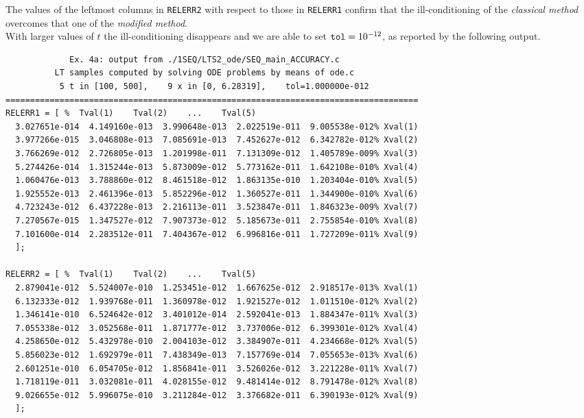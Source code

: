 \documentclass[a4paper,10pt]{report}%
\begin{document}
The values of the leftmost columns in {\tt RELERR2} with respect to those in {\tt RELERR1} confirm that the
ill-conditioning of the {\em classical method} overcomes that one of the {\em modified method}.
\\
With larger values of $t$ the ill-conditioning disappears and we are able to set ${\tt tol}=10^{-12}$,
as reported by the following output.
\begin{lstlisting}
             Ex. 4a: output from ./1SEQ/LTS2_ode/SEQ_main_ACCURACY.c
          LT samples computed by solving ODE problems by means of ode.c
           5 t in [100, 500],    9 x in [0, 6.28319],    tol=1.000000e-012
====================================================================================
RELERR1 = [ %  Tval(1)    Tval(2)    ...    Tval(5)
  3.027651e-014  4.149160e-013  3.990648e-013  2.022519e-011  9.005538e-012% Xval(1)
  3.977266e-015  3.046808e-013  7.085691e-013  7.452627e-012  6.342782e-012% Xval(2)
  3.766269e-012  2.726805e-013  1.201998e-011  7.131309e-012  1.405789e-009% Xval(3)
  5.274426e-014  1.315244e-013  5.873009e-012  5.773162e-011  1.642108e-010% Xval(4)
  1.060476e-013  3.788860e-012  8.461518e-012  1.863135e-010  1.203404e-010% Xval(5)
  1.925552e-013  2.461396e-013  5.852296e-012  1.360527e-011  1.344900e-010% Xval(6)
  4.723243e-012  6.437228e-013  2.216113e-011  3.523847e-011  1.846323e-009% Xval(7)
  7.270567e-015  1.347527e-012  7.907373e-012  5.185673e-011  2.755854e-010% Xval(8)
  7.101600e-014  2.283512e-011  7.404367e-012  6.996816e-011  1.727209e-011% Xval(9)
  ];

RELERR2 = [ %  Tval(1)    Tval(2)    ...    Tval(5)
  2.879041e-012  5.524007e-010  1.253451e-012  1.667625e-012  2.918517e-013% Xval(1)
  6.132333e-012  1.939768e-011  1.360978e-012  1.921527e-012  1.011510e-012% Xval(2)
  1.346141e-010  6.524642e-012  3.401012e-014  2.592041e-013  1.884347e-011% Xval(3)
  7.055338e-012  3.052568e-011  1.871777e-012  3.737006e-012  6.399301e-012% Xval(4)
  4.258650e-012  5.432978e-010  2.004103e-012  3.384907e-011  4.234668e-012% Xval(5)
  5.856023e-012  1.692979e-011  7.438349e-013  7.157769e-014  7.055653e-013% Xval(6)
  2.601251e-010  6.054705e-012  1.856841e-011  3.526026e-012  3.221228e-011% Xval(7)
  1.718119e-011  3.032081e-011  4.028155e-012  9.481414e-012  8.791478e-012% Xval(8)
  9.026655e-012  5.996075e-010  3.211284e-012  3.376682e-011  6.390193e-012% Xval(9)
  ];
\end{lstlisting}
\end{document}
